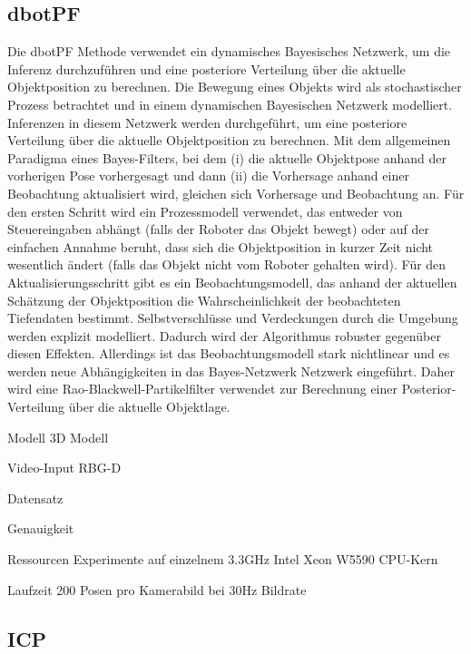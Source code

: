 \documentclass[a4paper, 11pt]{article}
\begin{document}
\begin{multicols*}{2}
    \subsection{dbotPF}
    Die dbotPF\cite{dbotPF} Methode verwendet ein dynamisches Bayesisches Netzwerk, um die Inferenz durchzuführen und eine posteriore Verteilung über die aktuelle Objektposition zu berechnen.
    Die Bewegung eines Objekts wird als stochastischer Prozess betrachtet und in einem dynamischen Bayesischen Netzwerk modelliert. Inferenzen in diesem Netzwerk werden durchgeführt, um eine posteriore Verteilung über die aktuelle Objektposition zu berechnen.
    Mit dem allgemeinen Paradigma eines Bayes-Filters, bei dem (i) die aktuelle Objektpose anhand der vorherigen Pose vorhergesagt und dann (ii) die Vorhersage anhand einer Beobachtung aktualisiert wird, gleichen sich Vorhersage und Beobachtung an.
    Für den ersten Schritt wird ein Prozessmodell verwendet, das entweder von Steuereingaben abhängt (falls der Roboter das Objekt bewegt) oder auf der einfachen Annahme beruht, dass sich die Objektposition in kurzer Zeit nicht wesentlich ändert (falls das Objekt nicht vom Roboter gehalten wird).
    Für den Aktualisierungsschritt gibt es ein Beobachtungsmodell, das anhand der aktuellen Schätzung der Objektposition die Wahrscheinlichkeit der beobachteten Tiefendaten bestimmt. Selbstverschlüsse und Verdeckungen durch die Umgebung werden explizit modelliert. Dadurch wird der Algorithmus robuster gegenüber diesen Effekten.
    Allerdings ist das Beobachtungsmodell stark nichtlinear und es werden neue Abhängigkeiten in das Bayes-Netzwerk Netzwerk eingeführt. Daher wird eine Rao-Blackwell-Partikelfilter\cite{blackwellised} verwendet zur Berechnung einer Posterior-Verteilung über die aktuelle Objektlage.

    \begin{description*}
        \item[Modell] 3D Modell
        \item[Video-Input] RBG-D
        \item[Datensatz]
        \item[Genauigkeit]
        \item[Ressourcen] Experimente auf einzelnem 3.3GHz Intel Xeon W5590 CPU-Kern
        \item[Laufzeit] 200 Posen pro Kamerabild bei 30Hz Bildrate
    \end{description*}

    \subsection{ICP}


\end{multicols*}
\end{document}

